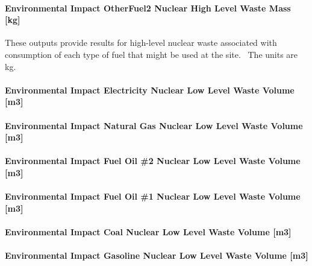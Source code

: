\paragraph{Environmental Impact OtherFuel2 Nuclear High Level Waste Mass {[}kg{]}}\label{environmental-impact-otherfuel2-nuclear-high-level-waste-mass-kg}

These outputs provide results for high-level nuclear waste associated with consumption of each type of fuel that might be used at the site.~ The units are kg.

\paragraph{Environmental Impact Electricity Nuclear Low Level Waste Volume {[}m3{]}}\label{environmental-impact-electricity-nuclear-low-level-waste-volume-m3}

\paragraph{Environmental Impact Natural Gas Nuclear Low Level Waste Volume {[}m3{]}}\label{environmental-impact-natural-gas-nuclear-low-level-waste-volume-m3}

\paragraph{Environmental Impact Fuel Oil \#2 Nuclear Low Level Waste Volume {[}m3{]}}\label{environmental-impact-fuel-oil-2-nuclear-low-level-waste-volume-m3}

\paragraph{Environmental Impact Fuel Oil \#1 Nuclear Low Level Waste Volume {[}m3{]}}\label{environmental-impact-fuel-oil-1-nuclear-low-level-waste-volume-m3}

\paragraph{Environmental Impact Coal Nuclear Low Level Waste Volume {[}m3{]}}\label{environmental-impact-coal-nuclear-low-level-waste-volume-m3}

\paragraph{Environmental Impact Gasoline Nuclear Low Level Waste Volume {[}m3{]}}\label{environmental-impact-gasoline-nuclear-low-level-waste-volume-m3}

